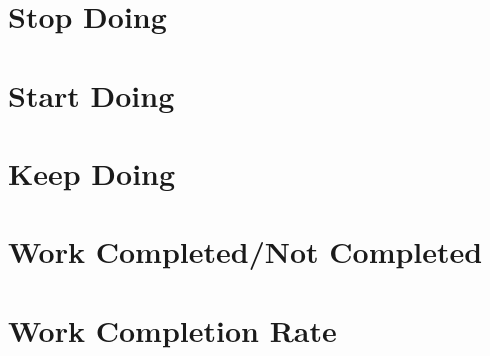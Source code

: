 \documentclass[12pt,letterpaper]{article}
\begin{document}
	\section*{Stop Doing}
	\section*{Start Doing}
	\section*{Keep Doing}
	\section*{Work Completed/Not Completed}
	\section*{Work Completion Rate}
\end{document}
